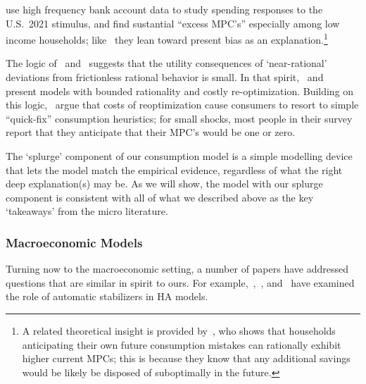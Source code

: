 \documentclass[qe]{econsocart}
\begin{document}
\cite{indarte2024explains} use high frequency bank account data to study spending responses to the U.S.\ 2021 stimulus, and find sustantial ``excess MPC's'' especially among low income households; like~\cite{lmmPresentBias} they lean toward present bias as an explanation.\footnote{A related theoretical insight is provided by~\cite{Lian2023-ca}, who shows that households anticipating their own future consumption mistakes can rationally exhibit higher current MPCs; this is because they know that any additional savings would be likely be disposed of suboptimally in the future.}

The logic of~\cite{akerlof1985near} and~\cite{cochrane1989sensitivity} suggests that the utility consequences of `near-rational' deviations from frictionless rational behavior is small.
In that spirit,~\cite{BoutrosWindfall} and~\cite{ilutEconomic} present models with bounded rationality and costly re-optimization.  Building on this logic,~\cite{ansQuickfix} argue that costs of reoptimization cause consumers to resort to simple ``quick-fix'' consumption heuristics; for small shocks, most people in their survey report that they anticipate that their MPC's would be one or zero.

The `splurge' component of our consumption model is a simple modelling device that lets the model match the empirical evidence, regardless of what the right deep explanation(s) may be. As we will show, the model with our splurge component is consistent with all of what we described above as the key `takeaways' from the micro literature.

\label{macroeconomic-models}
\subsubsection{Macroeconomic Models}
Turning now to the macroeconomic setting, a number of papers have addressed questions that are similar in spirit to ours.  For example,~\cite{mckay2016role},~\cite{mckay2021optimal}, and~\cite{phan2024welfare} have examined the role of automatic stabilizers in HA models.
\end{document}
